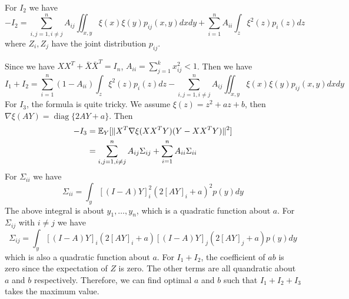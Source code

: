 \documentclass{article}
\DeclarePairedDelimiter\norm{\lVert}{\rVert}
\def\E{\mathbb{E}}
\DeclareMathOperator*{\diag}{diag}
\begin{document}
For $I_2$
we have
\begin{equation*}
-I_2   = \sum_{i,j=1, i \neq j}^n A_{ij} \iint_{x,y} \xi(x)\xi(y) p_{ij}(x,y) dx dy + \sum_{i=1}^n A_{ii} \int_z \xi^2(z) p_i(z) dz 
\end{equation*}
where $Z_i, Z_j$ have the joint distribution $p_{ij}$.

Since we have $XX^T + \bar{X}\bar{X}^T = I_n$, $A_{ii} = \sum_{j=1}^k x^2_{ij} < 1$. Then we have
\begin{equation}\label{eq:I1plusI2}
I_1+ I_2 =   \sum_{i=1}^n (1-A_{ii}) \int_z \xi^2(z) p_i(z) dz  - \sum_{i,j=1, i \neq j}^n A_{ij} \iint_{x,y} \xi(x)\xi(y) p_{ij}(x,y) dx dy
\end{equation}
For $I_3$, the formula is quite tricky. We assume $\xi(z) = z^2 + a z + b $, then $\nabla \xi (AY) = \diag\{2AY+ a\}$. 
Then
\begin{align*}
-I_3 & = \E_Y[\norm{X^T \nabla\xi(XX^TY)(Y-XX^TY)}^2] \\ 
 & = \sum_{i,j=1, i \neq j}^n A_{ij}\Sigma_{ij} + \sum_{i=1}^n A_{ii}\Sigma_{ii} 
\end{align*}
For $\Sigma_{ii}$ we have
\begin{equation}\label{eq:sigmaii}
\Sigma_{ii} = \int_y [(I - A)Y]^2_i (2[AY]_i + a)^2 p(y)dy
\end{equation}
The above integral is about $y_1, \dots, y_n$, which is a quadratic function about $a$.
For $\Sigma_{ij}$ with $i\neq j$ we have
\begin{equation*}
\Sigma_{ij} = \int_y [(I - A)Y]_i (2[AY]_i + a)[(I - A)Y]_j (2[AY]_j + a) p(y)dy
\end{equation*}
which is also a quadratic function about $a$.
For $I_1 + I_2$, the coefficient of $ab$ is zero since the expectation of $Z$ is zero. The other terms are all quandratic about $a$ and $b$ respectively. Therefore, we can find optimal $a$ and $b$ such that $I_1 + I_2 + I_3$ takes the maximum value.
\end{document}
